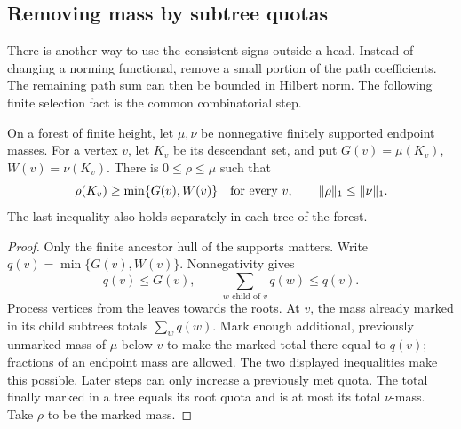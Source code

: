 \subsection{Removing mass by subtree quotas}
\label{sec:linear-quota-removal}

There is another way to use the consistent signs outside a head. Instead
of changing a norming functional, remove a small portion of the path
coefficients. The remaining path sum can then be bounded in Hilbert norm.
The following finite selection fact is the common combinatorial step.

\begin{lemma}
\label{lem:linear-subtree-quota}
On a forest of finite height, let \(\mu,\nu\) be nonnegative finitely
supported endpoint masses. For a vertex \(v\), let \(K_v\) be its
descendant set, and put \(G(v)=\mu(K_v)\), \(W(v)=\nu(K_v)\).
There is \(0\le\rho\le\mu\) such that
\[
 \rho(K_v)\ge\min\{G(v),W(v)\}\quad\hbox{for every }v,
 \qquad \|\rho\|_1\le\|\nu\|_1.
\]
The last inequality also holds separately in each tree of the forest.
\end{lemma}
\begin{proof}
Only the finite ancestor hull of the supports matters. Write
\(q(v)=\min\{G(v),W(v)\}\). Nonnegativity gives
\[
 q(v)\le G(v),\qquad
 \sum_{w\text{ child of }v}q(w)\le q(v).
\]
Process vertices from the leaves towards the roots. At \(v\), the mass
already marked in its child subtrees totals \(\sum_wq(w)\). Mark enough
additional, previously unmarked mass of \(\mu\) below \(v\) to make
the marked total there equal to \(q(v)\); fractions of an endpoint mass
are allowed. The two displayed inequalities make this possible. Later
steps can only increase a previously met quota. The total finally marked
in a tree equals its root quota and is at most its total \(\nu\)-mass.
Take \(\rho\) to be the marked mass.
\end{proof}

